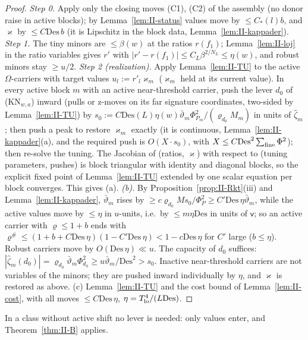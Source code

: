 \documentclass[10pt]{amsart}
\theoremstyle{definition}
\theoremstyle{remark}
\begin{document}
\begin{proof}
\emph{Step 0.}  Apply only the closing moves (C1), (C2) of the assembly (no donor
raise in active blocks); by Lemma~\ref{lem:II-status} values move by $\le C_*(l)b$,
and $\varkappa$ by $\le C\mathrm{Des}\,b$ (it is Lipschitz in the block data,
Lemma~\ref{lem:II-kappader}).  \emph{Step 1.}  The tiny minors are $\le\beta(w)$ at
the ratios $r(f_1)$; Lemma~\ref{lem:II-loj} in the ratio variables gives $r'$
with $|r'-r(f_1)|\le C_L\beta^{2/N_L}\le\eta(w)$, and robust minors stay $\ge u/2$.
\emph{Step 2 (realization).}  Apply Lemma~\ref{lem:II-TU} to the active
$\Omega$-carriers with target values $u_l:=r'_l\varkappa_m$ ($\varkappa_m$ held at its current
value).  In every active block $m$ with an active near-threshold carrier, push
the lever $d_0$ of (KN$_{w,a}$) inward (pulls or z-moves on its far signature
coordinates, two-sided by Lemma~\ref{lem:II-TU}) by
$s_0:=C\mathrm{Des}(L)\eta(w)\bar\vartheta_m\Phi_{P_m}^2/(\varrho_{d_0}M_m)$ in units of
$\hat\zeta_m$; then push a peak to restore $\varkappa_m$ exactly (it is continuous,
Lemma~\ref{lem:II-kappader}(a), and the required push is $O(X\cdot s_0)$, with $X\le
C\mathrm{Des}^2\sum_{\rm fine}\Phi^2$); then re-solve the tuning.  The Jacobian of
(ratios, $\varkappa$) with respect to (tuning parameters, pushes) is block
triangular with identity and diagonal blocks, so the explicit fixed point of
Lemma~\ref{lem:II-TU} extended by one scalar equation per block converges.  This
gives (a).  \emph{(b).}  By Proposition~\ref{prop:II-Rkt}(iii) and
Lemma~\ref{lem:II-kappader}, $\bar\vartheta_m$ rises by $\ge c\varrho_{d_0}M s_0/\Phi_P^2\ge
C'\mathrm{Des}\,\eta\bar\vartheta_m$, while the active values move by $\le\eta$ in $u$-units,
i.e.\ by $\le m\eta\mathrm{Des}$ in units of $\mathsf v$; so an active carrier with
$\varrho\le1+b$ ends with $\varrho^\#\le(1+b+C\mathrm{Des}\,\eta)(1-C'\mathrm{Des}\,\eta)<1-
c\mathrm{Des}\,\eta$ for $C'$ large ($b\le\eta$).  Robust carriers move by $O(\mathrm{Des}\,
\eta)\ll u$.  The capacity of $d_0$ suffices: $|\hat\zeta_m(d_0)|=\varrho_{d_0}\bar\vartheta_m
\Phi_{d_0}^2\ge u\bar\vartheta_m/\mathrm{Des}^2>s_0$.  Inactive near-threshold carriers are not
variables of the minors; they are pushed inward individually by $\eta$, and
$\varkappa$ is restored as above.  (c) Lemma~\ref{lem:II-TU} and the cost bound of
Lemma~\ref{lem:II-cost}, with all moves $\le C\mathrm{Des}\,\eta$, $\eta=T_{\rm lo}^4/(L\mathrm{Des})$.
\end{proof}

In a class without active shift no lever is needed: only values enter, and
Theorem~\ref{thm:II-B} applies.
\end{document}
